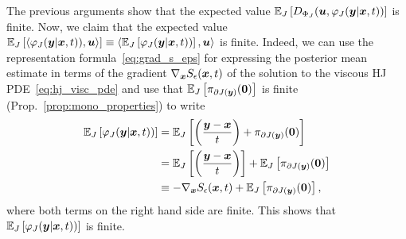 The previous arguments show that the expected value $\mathbb{E}_{J}\left [{D_{\Phi_{J}}(\boldsymbol{u},\varphi_{J}(\boldsymbol{y}|\boldsymbol{x},t))}\right]$ is finite. Now, we claim that the expected value $\mathbb{E}_{J}\left [{\left\langle \varphi_{J}(\boldsymbol{y}|\boldsymbol{x},t)),\boldsymbol{u}\right\rangle}\right] \equiv \left\langle\mathbb{E}_{J}\left [{\varphi_{J}(\boldsymbol{y}|\boldsymbol{x},t))}\right],\boldsymbol{u}\right\rangle$ is finite. Indeed, we can use the representation formula~\eqref{eq:grad_s_eps} for expressing the posterior mean estimate in terms of the gradient $\nabla_{\boldsymbol{x}}S_\epsilon(\boldsymbol{x},t)$ of the solution to the viscous HJ PDE~\eqref{eq:hj_visc_pde} and use that $\mathbb{E}_{J}\left [{\pi_{\partial J(\boldsymbol{y})}(\boldsymbol{0})}\right]$ is finite (Prop.~\ref{prop:mono_properties}) to write
\[
\begin{alignedat}{1}
\mathbb{E}_{J}\left [{\varphi_{J}(\boldsymbol{y}|\boldsymbol{x},t))}\right] &= \mathbb{E}_{J}\left [{\left(\frac{\boldsymbol{y}-\boldsymbol{x}}{t}\right) + \pi_{\partial J(\boldsymbol{y})}(\boldsymbol{0})}\right] \\
&= \mathbb{E}_{J}\left [{\left(\frac{\boldsymbol{y}-\boldsymbol{x}}{t}\right)}\right] + \mathbb{E}_{J}\left [{\pi_{\partial J(\boldsymbol{y})}(\boldsymbol{0})}\right] \\
&\equiv -\nabla_{\boldsymbol{x}}S_\epsilon(\boldsymbol{x},t) +  \mathbb{E}_{J}\left [{\pi_{\partial J(\boldsymbol{y})}(\boldsymbol{0})}\right],
\end{alignedat}
\]
where both terms on the right hand side are finite. This shows that $\mathbb{E}_{J}\left [{\varphi_{J}(\boldsymbol{y}|\boldsymbol{x},t))}\right]$ is finite.

